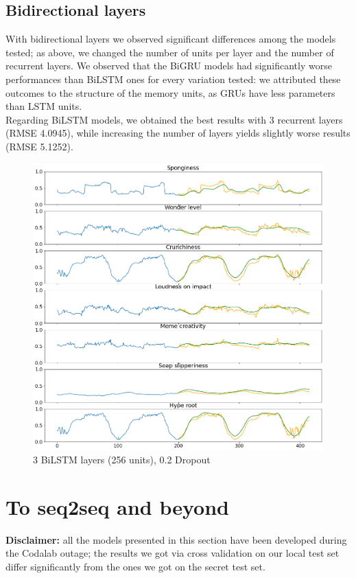 \documentclass[10.5pt,a4paper,twocolumn]{article}
\begin{document}
\subsection{Bidirectional layers}
With bidirectional layers we observed significant differences among the models tested;
as above, we changed the number of units per layer and the number of recurrent layers.
We observed that the BiGRU models had significantly worse performances than BiLSTM ones 
for every variation tested: we attributed these outcomes to the structure of the memory
units, as GRUs have less parameters than LSTM units.\\
Regarding BiLSTM models, we obtained the best results with 3 recurrent layers (RMSE 4.0945), while increasing 
the number of layers yields slightly worse results (RMSE 5.1252).
\begin{figure}[h]
    \centering
    \includegraphics[width=\linewidth]{pics/pred_BiLSTM.png}
    \caption{3 BiLSTM layers (256 units), 0.2 Dropout}
\end{figure}

\section{To seq2seq and beyond}
\label{seq2seq}
\textbf{Disclaimer:} all the models presented in this section have been 
developed during the Codalab outage; the results we got via cross validation
on our local test set differ significantly from the ones we got on the secret test set.\\
\end{document}
